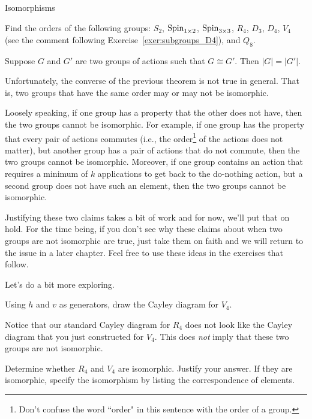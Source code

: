 \begin{section}{Isomorphisms}
\begin{exercise}
Find the orders of the following groups: $S_2$, $\operatorname{Spin}_{1\times 2}$, $\operatorname{Spin}_{3\times 3}$, $R_4$, $D_3$, $D_4$, $V_4$ (see the comment following Exercise~\ref{exer:subgroups_D4}), and $Q_8$.
\end{exercise}

\begin{theorem}\label{thm:iso_same_order}
Suppose $G$ and $G'$ are two groups of actions such that $G\cong G'$.  Then $|G|=|G'|$.
\end{theorem}

Unfortunately, the converse of the previous theorem is not true in general.  That is, two groups that have the same order may or may not be isomorphic.  

Loosely speaking, if one group has a property that the other does not have, then the two groups cannot be isomorphic.  For example, if one group has the property that every pair of actions commutes (i.e., the order\footnote{Don't confuse the word ``order" in this sentence with the order of a group.} of the actions does not matter), but another group has a pair of actions that do not commute, then the two groups cannot be isomorphic.  Moreover, if one group contains an action that requires a minimum of $k$ applications to get back to the do-nothing action, but a second group does not have such an element, then the two groups cannot be isomorphic.  

Justifying these two claims takes a bit of work and for now, we'll put that on hold.  For the time being, if you don't see why these claims about when two groups are not isomorphic are true, just take them on faith and we will return to the issue in a later chapter.  Feel free to use these ideas in the exercises that follow.

Let's do a bit more exploring.

\begin{exercise}
Using $h$ and $v$ as generators, draw the Cayley diagram for $V_4$.
\end{exercise}

Notice that our standard Cayley diagram for $R_4$ does not look like the Cayley diagram that you just constructed for $V_4$.  This does \emph{not} imply that these two groups are not isomorphic.

\begin{problem}
Determine whether $R_4$ and $V_4$ are isomorphic.  Justify your answer.  If they are isomorphic, specify the isomorphism by listing the correspondence of elements.
\end{problem}


\end{section}
